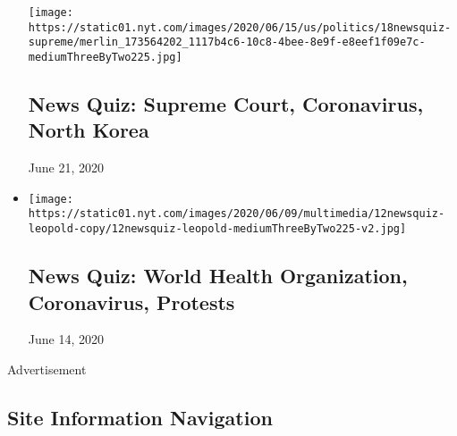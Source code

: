 \begin{itemize}
  \texttt{[image: https://static01.nyt.com/images/2020/06/15/us/politics/18newsquiz-supreme/merlin\_173564202\_1117b4c6-10c8-4bee-8e9f-e8eef1f09e7c-mediumThreeByTwo225.jpg]}

  \hypertarget{news-quiz-supreme-court-coronavirus-north-korea}{%
  \subsection{News Quiz: Supreme Court, Coronavirus, North
  Korea}\label{news-quiz-supreme-court-coronavirus-north-korea}}

  June 21, 2020
\item
  \href{https://www.nytimes.com/interactive/2020/06/12/briefing/world-health-organization-coronavirus-protests-news-quiz.html}{}

  \texttt{[image: https://static01.nyt.com/images/2020/06/09/multimedia/12newsquiz-leopold-copy/12newsquiz-leopold-mediumThreeByTwo225-v2.jpg]}

  \hypertarget{news-quiz-world-health-organization-coronavirus-protests}{%
  \subsection{News Quiz: World Health Organization, Coronavirus,
  Protests}\label{news-quiz-world-health-organization-coronavirus-protests}}

  June 14, 2020
\end{itemize}

Advertisement

\hypertarget{site-information-navigation}{%
\subsection{Site Information
Navigation}\label{site-information-navigation}}

